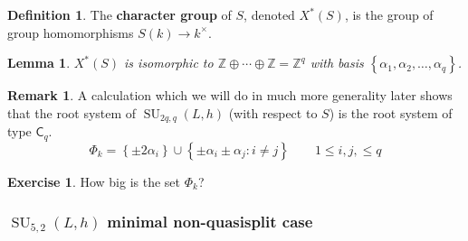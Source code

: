 \documentclass[12pt]{article}
\newtheorem{lemma}[theorem]{Lemma}
\theoremstyle{definition}
\newtheorem{definition}[theorem]{Definition}
\newtheorem{remark}[theorem]{Remark}
\newtheorem{exercise}[theorem]{Exercise}
\numberwithin{theorem}{subsection}
\newcommand{\Z}{\mathbb{Z}}
\newcommand{\lb}{\left\{}
\newcommand{\rb}{\right\}}
\newcommand{\tbf}{\textbf}
\DeclareMathOperator{\SU}{SU}
\begin{document}
\begin{definition}
The \tbf{character group} of $S$, denoted $X^*(S)$, is the group of group homomorphisms $S(k) \to k^\times$.
\end{definition}

\begin{lemma}
$X^*(S)$ is isomorphic to $\Z \oplus \cdots \oplus \Z = \Z^q$ with basis $\lb \alpha_1, \alpha_2, \ldots, \alpha_q \rb$.
\end{lemma}

\begin{remark}
A calculation which we will do in much more generality later shows that the root system of $\SU_{2q,q}(L,h)$ (with respect to $S$) is the root system of type $\mathsf{C}_q$.
\[
	\Phi_k = \lb \pm 2 \alpha_i \rb \cup \lb \pm \alpha_i \pm \alpha_j : i \neq j \rb \qquad 1 \le i,j, \le q
\]
\end{remark}

\begin{exercise}
How big is the set $\Phi_k$?
\end{exercise}

\subsubsection{$\SU_{5,2}(L,h)$ minimal non-quasisplit case}
\end{document}
